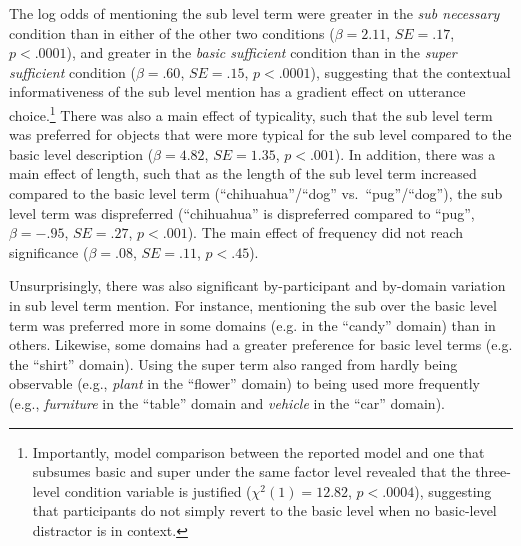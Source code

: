 \documentclass[11pt]{article}
\newcommand{\jd}[1]{\textcolor{Red}{[jd: #1]}}
\newcommand{\figref}[1]{Figure \ref{#1}}
\begin{document}
The log odds of mentioning the sub level term were greater in the \emph{sub necessary} condition than in either of the other two conditions ($\beta = 2.11$, $SE = .17$, $p < .0001$), and greater in the \emph{basic sufficient} condition than in the \emph{super sufficient} condition ($\beta = .60$, $SE = .15$, $p < .0001$), suggesting that the contextual informativeness of the sub level mention has a gradient effect on utterance choice.\footnote{Importantly, model comparison between the reported model and one that subsumes basic and super under the same factor level revealed that the three-level condition variable is justified ($\chi ^2 (1) = 12.82$, $p < .0004$), suggesting that participants do not simply revert to the basic level when no basic-level distractor is in context.} There was also a main effect of typicality, such that the sub level term was preferred for objects that were more typical for the sub level compared to the basic level  description ($\beta = 4.82$, $SE = 1.35$, $p < .001$). In addition, there was a main effect of length, such that as the length of the sub level term increased compared to the basic level term (``chihuahua''/``dog'' vs.~``pug''/``dog''), the sub level term was dispreferred (``chihuahua'' is dispreferred compared to ``pug'', $\beta = -.95$, $SE = .27$, $p < .001$). The main effect of frequency did not reach significance ($\beta = .08$, $SE = .11$, $p < .45$).


%


Unsurprisingly, there was also significant by-participant and by-domain variation in sub level term mention. %
For instance, mentioning the sub over the basic level term was preferred more in some domains (e.g. in the ``candy'' domain) than in others. Likewise, some domains had a greater preference for basic level terms (e.g. the ``shirt'' domain). Using the super term also ranged from hardly being observable (e.g., \emph{plant} in the ``flower'' domain) to being used more frequently (e.g., \emph{furniture} in the ``table'' domain and \emph{vehicle} in the ``car'' domain). 
\end{document}
